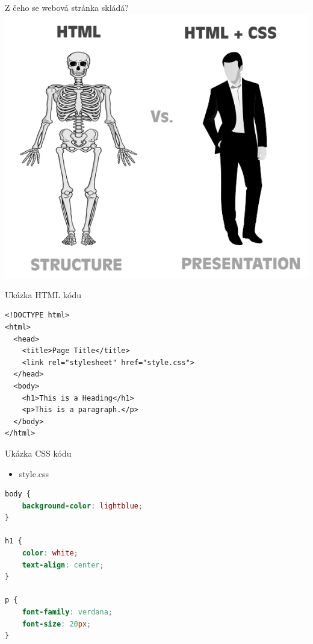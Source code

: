 \documentclass{beamer}
\begin{document}
\begin{frame}{Z čeho se webová stránka skládá?}
  \includegraphics[width=\columnwidth]{html-vs-css}
\end{frame}

\begin{frame}[fragile, shrink=0]{Ukázka HTML kódu}

\begin{lstlisting}[language=HTML5]
<!DOCTYPE html>
<html>
  <head>
    <title>Page Title</title>
    <link rel="stylesheet" href="style.css">
  </head>
  <body>
    <h1>This is a Heading</h1>
    <p>This is a paragraph.</p>
  </body>
</html>
\end{lstlisting}

\end{frame}

\begin{frame}[fragile, shrink=0]{Ukázka CSS kódu}
\begin{itemize}
	\item style.css
\end{itemize}
\begin{lstlisting}[language=CSS]
body {
    background-color: lightblue;
}

h1 {
    color: white;
    text-align: center;
}

p {
    font-family: verdana;
    font-size: 20px;
}
\end{lstlisting}
\end{frame}
\end{document}
